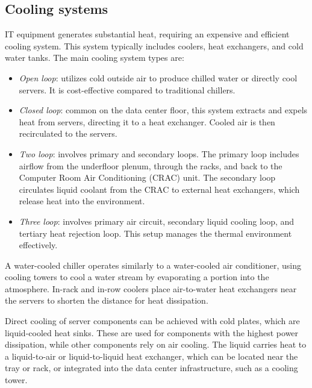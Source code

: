 \subsection{Cooling systems}
IT equipment generates substantial heat, requiring an expensive and efficient cooling system. 
This system typically includes coolers, heat exchangers, and cold water tanks. 
The main cooling system types are:
\begin{itemize}
    \item \textit{Open loop}: utilizes cold outside air to produce chilled water or directly cool servers. 
        It is cost-effective compared to traditional chillers.
    \item \textit{Closed loop}: common on the data center floor, this system extracts and expels heat from servers, directing it to a heat exchanger. 
        Cooled air is then recirculated to the servers.
    \item \textit{Two loop}: involves primary and secondary loops. 
        The primary loop includes airflow from the underfloor plenum, through the racks, and back to the Computer Room Air Conditioning (CRAC) unit. 
        The secondary loop circulates liquid coolant from the CRAC to external heat exchangers, which release heat into the environment.
    \item \textit{Three loop}: involves primary air circuit, secondary liquid cooling loop, and tertiary heat rejection loop. 
        This setup manages the thermal environment effectively.
\end{itemize}
A water-cooled chiller operates similarly to a water-cooled air conditioner, using cooling towers to cool a water stream by evaporating a portion into the atmosphere. 
In-rack and in-row coolers place air-to-water heat exchangers near the servers to shorten the distance for heat dissipation.

Direct cooling of server components can be achieved with cold plates, which are liquid-cooled heat sinks. 
These are used for components with the highest power dissipation, while other components rely on air cooling. 
The liquid carries heat to a liquid-to-air or liquid-to-liquid heat exchanger, which can be located near the tray or rack, or integrated into the data center infrastructure, such as a cooling tower.

